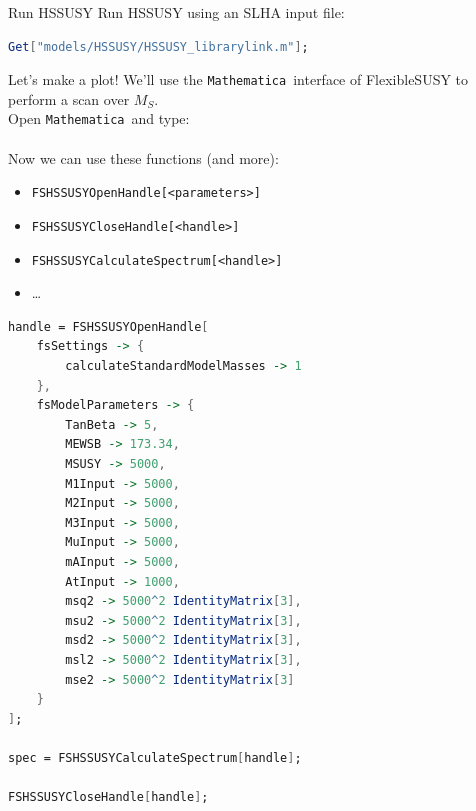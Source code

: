 \documentclass[hyperref={pdfpagelabels=false},ngerman]{beamer}
\newcommand{\MS}{\ensuremath{M_S}}
\newcommand{\Mathematica}{\texttt{Mathematica}}
\begin{document}
\begin{frame}{Run HSSUSY}
  Run HSSUSY using an SLHA input file:\\[2em]
  \usebox{\listbox}
\end{frame}

\begin{lrbox}{\listbox}\begin{lstlisting}[language=Mathematica]
Get["models/HSSUSY/HSSUSY_librarylink.m"];
\end{lstlisting}\end{lrbox} %

\begin{frame}{Let's make a plot!}
  We'll use the \Mathematica\ interface of FlexibleSUSY to perform a
  scan over $\MS$.\\[1em]
  Open \Mathematica\ and type:\\[2em]
  \usebox{\listbox}
  \\[1em]
  Now we can use these functions (and more):\\
  \begin{itemize}
  \item[] \texttt{FSHSSUSYOpenHandle[<parameters>]}
  \item[] \texttt{FSHSSUSYCloseHandle[<handle>]}
  \item[] \texttt{FSHSSUSYCalculateSpectrum[<handle>]}
  \item[] \ldots
  \end{itemize}
\end{frame}

\begin{lrbox}{\listbox}\begin{lstlisting}[language=Mathematica]
handle = FSHSSUSYOpenHandle[
    fsSettings -> {
        calculateStandardModelMasses -> 1
    },
    fsModelParameters -> {
        TanBeta -> 5,
        MEWSB -> 173.34,
        MSUSY -> 5000,
        M1Input -> 5000,
        M2Input -> 5000,
        M3Input -> 5000,
        MuInput -> 5000,
        mAInput -> 5000,
        AtInput -> 1000,
        msq2 -> 5000^2 IdentityMatrix[3],
        msu2 -> 5000^2 IdentityMatrix[3],
        msd2 -> 5000^2 IdentityMatrix[3],
        msl2 -> 5000^2 IdentityMatrix[3],
        mse2 -> 5000^2 IdentityMatrix[3]
    }
];

spec = FSHSSUSYCalculateSpectrum[handle];

FSHSSUSYCloseHandle[handle];
\end{lstlisting}\end{lrbox} %
\end{document}
